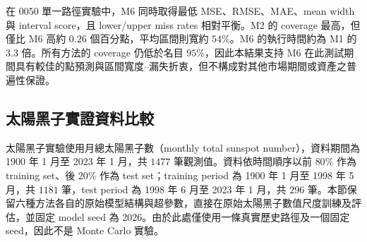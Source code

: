 \begin{table}[htbp]
\centering
\caption{0050.TW 原始超參數之點預測與區間預測比較}
\label{tab:0050-original}
\end{table}

在 0050 單一路徑實驗中，M6 同時取得最低 MSE、RMSE、MAE、mean width 與 interval score，且 lower/upper miss rates 相對平衡。M2 的 coverage 最高，但僅比 M6 高約 $0.26$ 個百分點，平均區間則寬約 $54\%$。M6 的執行時間約為 M1 的 $3.3$ 倍。所有方法的 coverage 仍低於名目 $95\%$，因此本結果支持 M6 在此測試期間具有較佳的點預測與區間寬度--漏失折衷，但不構成對其他市場期間或資產之普遍性保證。

\subsection{太陽黑子實證資料比較}
\label{subsec:sunspot-results}

太陽黑子實驗使用月總太陽黑子數（monthly total sunspot number），資料期間為 1900 年 1 月至 2023 年 1 月，共 $1477$ 筆觀測值。資料依時間順序以前 $80\%$ 作為 training set、後 $20\%$ 作為 test set；training period 為 1900 年 1 月至 1998 年 5 月，共 $1181$ 筆，test period 為 1998 年 6 月至 2023 年 1 月，共 $296$ 筆。本節保留六種方法各自的原始模型結構與超參數，直接在原始太陽黑子數值尺度訓練及評估，並固定 model seed 為 2026。由於此處僅使用一條真實歷史路徑及一個固定 seed，因此不是 Monte Carlo 實驗。

